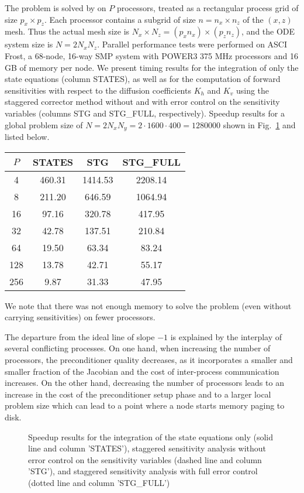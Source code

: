 The problem is solved by {\cvodes} on $P$ processors, treated as a 
rectangular process grid of size $p_x \times p_z$.
Each processor contains a subgrid of size $n = n_x \times n_z$ of the 
$(x,z)$ mesh.  Thus the actual mesh size is 
$N_x \times N_z = (p_x n_x) \times (p_z n_z)$,
and the ODE system size is $N = 2 N_x N_z$.
Parallel performance tests were performed on ASCI Frost, a 68-node, 16-way SMP system
with POWER3 375 MHz processors and 16 GB of memory per node.
We present timing results for the integration of only the state equations
(column STATES), as well as for
the computation of forward sensitivities with respect to the diffusion coefficients
$K_h$ and $K_v$ using the staggered corrector method without and with 
error control on the sensitivity variables (columns STG and
STG\_FULL, respectively). 
Speedup results for a global problem size of
$N = 2 N_x N_y = 2 \cdot 1600 \cdot 400 = 1280000$ 
shown in Fig.~\ref{f:pvfktTest} and listed below.

\begin{center}
  \begin{tabular}{cccc}\hline
    $P$ &  STATES  &   STG   & STG\_FULL \\ \hline
    4  &  460.31  &  1414.53  & 2208.14  \\
    8  &  211.20  &   646.59  & 1064.94  \\
    16  &   97.16  &   320.78  &  417.95  \\
    32  &   42.78  &   137.51  &  210.84  \\
    64  &   19.50  &    63.34  &   83.24  \\
    128  &   13.78  &    42.71  &   55.17  \\
    256  &    9.87  &    31.33  &   47.95  \\ \hline
  \end{tabular}
\end{center}

We note that there was not enough memory to solve the problem (even without
carrying sensitivities) on fewer processors.

The departure from the ideal line of slope $-1$ is explained by the 
interplay of several conflicting processes. On one hand, when increasing the 
number of processors, the preconditioner quality decreases, as it incorporates 
a smaller and smaller fraction of the Jacobian and the cost of inter-process 
communication increases. On the other hand, decreasing the number of processors
leads to an increase in the cost of the preconditioner setup phase and to a larger
local problem size which can lead to a point where a node starts memory paging to disk.
\begin{figure}
  {\centerline{}}
  \caption[Speedup results on a sensitivity problem]
  {Speedup results for the integration of the state equations only
    (solid line and column 'STATES'), staggered sensitivity analysis without
    error control on the sensitivity variables (dashed line and column 'STG'),
    and staggered sensitivity analysis with full error control (dotted line and
    column 'STG\_FULL')}
  \label{f:pvfktTest}
\end{figure}

